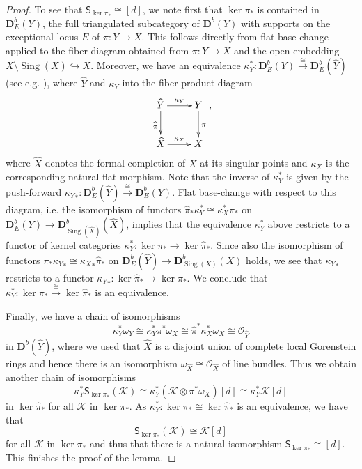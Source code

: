 \documentclass[a4paper,11pt, reqno]{amsart}
\def\DD{\mathbf D}
\def\OO{\mathcal O}
\def\sK{\mathscr{K}}
\def\Sing{{\operatorname{Sing}}}
\def\wh{\widehat}
\def\Db{\DD^b}
\newcommand{\bS}{\mathsf{S}}
\theoremstyle{plain}
\theoremstyle{definition}
\numberwithin{equation}{section}
\newlength{\arrow}
\begin{document}
\begin{proof}
    To see that $\bS_{\ker  \pi_\ast } \cong [d]$, we note first that $\ker \pi_\ast$ is contained in $\Db_E (Y)$, the full triangulated subcategory of $\Db(Y)$ with supports on the exceptional locus $E$ of $\pi \colon Y \to X$.
    This follows directly from flat base-change applied to the fiber diagram obtained from $\pi \colon Y \to X$ and the open embedding $X \setminus \Sing(X) \hookrightarrow X$.
    Moreover, we have an equivalence $\kappa_Y^\ast \colon \Db_E ( Y ) \xrightarrow{\cong} \Db_E ( \widehat{Y} )$ (see e.g. \cite[Corollary 2.9]{OrlovIdemp}), where $\widehat{Y}$ and $\kappa_Y$ into the fiber product diagram
    \begin{equation*}\label{diag:formal-base-change}
\xymatrix{
    \wh{Y}\ar@{->}[d]_{\wh{\pi}}\ar@{->}[r]^{\kappa_Y} & Y\ar@{->}[d]^{\pi}\\
 \wh{X} \ar@{->}[r]^{\kappa_X} & X} ,
\end{equation*}
where  $\widehat{X} $ denotes the formal completion of $X$ at its singular points and $\kappa_X$ is the corresponding natural flat morphism.
Note that the inverse of $\kappa_Y^\ast$ is given by the push-forward ${\kappa_Y}_\ast \colon \Db_E ( \widehat{Y} )  \xrightarrow{\cong} \Db_E ( Y )$.
    Flat base-change with respect to this diagram, i.e. the isomorphism of functors $\widehat{\pi}_\ast \kappa_Y^\ast \cong \kappa_X^\ast \pi_\ast$ on $\Db_E (Y) \to \Db_{\Sing(\widehat X)} (\widehat{X})$, implies that the equivalence $\kappa_Y^\ast$ above restricts to a functor of kernel categories $\kappa_Y^\ast \colon \ker \pi_\ast \to \ker \widehat{\pi}_\ast $.
    Since also the isomorphism of functors $\pi_\ast {\kappa_Y}_\ast \cong {\kappa_X }_\ast \widehat{\pi}_\ast $ on $\Db_E ( \widehat{Y} ) \to \Db_{\Sing (X) }( X )$ holds,
    we see that ${\kappa_Y}_\ast $ restricts to a functor ${\kappa_Y}_\ast \colon \ker \widehat{\pi}_\ast \to  \ker \pi_\ast$.
    We conclude that $\kappa_Y^\ast \colon \ker \pi_\ast \xrightarrow{\cong} \ker \widehat{\pi}_\ast $ is an equivalence.
    
    Finally, we have a chain of isomorphisms
    \[
    \kappa_Y^\ast\omega_Y \cong \kappa_Y^\ast\pi^\ast \omega_X \cong \widehat{\pi}^\ast\kappa_X^\ast \omega_X \cong \OO_{\wh{Y}} 
    \]
    in $\Db( \wh{Y} )$,
    where we used that $\wh{X}$ is a disjoint union of complete local Gorenstein rings and hence there is an isomorphism $\omega_{\wh{X}}\cong \OO_{\wh{X}}$ of line bundles.
    Thus we obtain another chain of isomorphisms
    \[
    \kappa^\ast_Y\bS_{\ker\pi_\ast} ( \sK ) \cong \kappa^\ast_Y ( \sK \otimes \pi^\ast \omega_X ) [d] \cong \kappa_Y^\ast \sK [d] 
    \]
    in $\ker \wh{\pi}_\ast$ for all $\sK$ in $\ker \pi_\ast$.
    As $\kappa_Y^\ast \colon \ker\pi_\ast  \cong \ker \wh{\pi}_\ast$ is an equivalence,
    we have that
    \[
    \bS_{\ker\pi_\ast} ( \sK )  \cong \sK [d] 
    \]
    for all $\sK$ in $\ker \pi_\ast$ and thus that there is a natural isomorphism $\bS_{\ker\pi_\ast} \cong [d]$.
    This finishes the proof of the lemma.
\end{proof}
\end{document}
